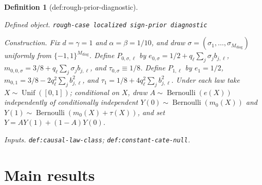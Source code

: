 \documentclass{article}
\newtheorem{definition}{Definition}
\begin{document}
\begin{definition}[def:rough-prior-diagnostic]\label{def:rough-prior-diagnostic}
\par\smallskip\noindent\emph{Defined object.} \texttt{rough-\allowbreak{}case localized sign-\allowbreak{}prior diagnostic}
\par\smallskip\noindent\emph{Construction.} Fix \(d=\gamma=1\) and \(\alpha=\beta=1/10\), and draw \(\sigma=(\sigma_1,\ldots,\sigma_{M_{\mathrm{diag}}})\) uniformly from \(\{-1,1\}^{M_{\mathrm{diag}}}\). Define \(P_{0,\sigma,\ell}\) by \(e_{0,\sigma}=1/2+q_{\ell}\sum_j\sigma_jb_{j,\ell}\), \(m_{0,0,\sigma}=3/8+q_{\ell}\sum_j\sigma_jb_{j,\ell}\), and \(\tau_{0,\sigma}\equiv1/8\). Define \(P_{1,\ell}\) by \(e_1=1/2\), \(m_{0,1}=3/8-2q_{\ell}^2\sum_jb_{j,\ell}^2\), and \(\tau_1=1/8+4q_{\ell}^2\sum_jb_{j,\ell}^2\). Under each law take \(X\sim\operatorname{Unif}([0,1])\); conditional on \(X\), draw \(A\sim\operatorname{Bernoulli}(e(X))\) independently of conditionally independent \(Y(0)\sim\operatorname{Bernoulli}(m_0(X))\) and \(Y(1)\sim\operatorname{Bernoulli}(m_0(X)+\tau(X))\), and set \(Y=AY(1)+(1-A)Y(0)\).
\par\smallskip\noindent\emph{Inputs.} \texttt{def:\allowbreak{}causal-\allowbreak{}law-\allowbreak{}class}; \texttt{def:\allowbreak{}constant-\allowbreak{}cate-\allowbreak{}null}.
\end{definition}

\section{Main results}
\end{document}
